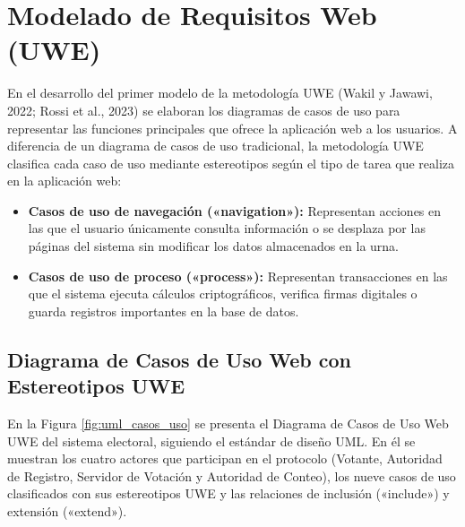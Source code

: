 \section{Modelado de Requisitos Web (UWE)}
\label{sec:casos_uso_actividades}
\label{sec:requisitos_uwe}

En el desarrollo del primer modelo de la metodología UWE (Wakil y Jawawi, 2022; Rossi et al., 2023) se elaboran los diagramas de casos de uso para representar las funciones principales que ofrece la aplicación web a los usuarios. A diferencia de un diagrama de casos de uso tradicional, la metodología UWE clasifica cada caso de uso mediante estereotipos según el tipo de tarea que realiza en la aplicación web:

\begin{itemize}
	\item \textbf{Casos de uso de navegación («navigation»):} Representan acciones en las que el usuario únicamente consulta información o se desplaza por las páginas del sistema sin modificar los datos almacenados en la urna.
	\item \textbf{Casos de uso de proceso («process»):} Representan transacciones en las que el sistema ejecuta cálculos criptográficos, verifica firmas digitales o guarda registros importantes en la base de datos.
\end{itemize}

\subsection{Diagrama de Casos de Uso Web con Estereotipos UWE}
\label{subsec:casos_uso_uwe}

En la Figura \ref{fig:uml_casos_uso} se presenta el Diagrama de Casos de Uso Web UWE del sistema electoral, siguiendo el estándar de diseño UML. En él se muestran los cuatro actores que participan en el protocolo (Votante, Autoridad de Registro, Servidor de Votación y Autoridad de Conteo), los nueve casos de uso clasificados con sus estereotipos UWE y las relaciones de inclusión («include») y extensión («extend»).


